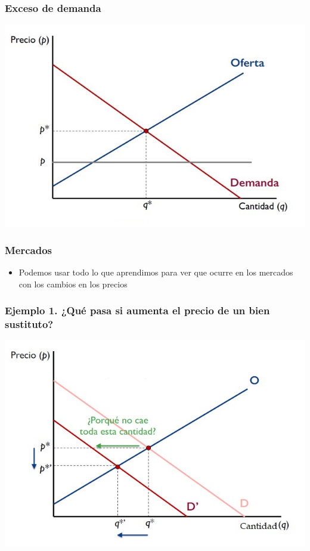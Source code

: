 \documentclass{beamer}
\begin{document}
\begin{frame}
\frametitle{Exceso de demanda}
\includegraphics[scale=0.6]{Slides Principios de Economia/Figures/Tema_07.3_equilibrioofertademanda_0excesodedemanda.jpg}
\end{frame}

\begin{frame}
\frametitle{Mercados}
\begin{itemize}
    \item Podemos usar todo lo que aprendimos para ver que ocurre en los mercados con los cambios en los precios
\end{itemize}
\end{frame}

\begin{frame}
\frametitle{Ejemplo 1. ¿Qué pasa si aumenta el precio de un bien sustituto?}
\centering
\includegraphics[scale=0.6]{Slides Principios de Economia/Figures/Tema_07.4_equilibrioofertademanda.jpg}
\end{frame}
\end{document}
